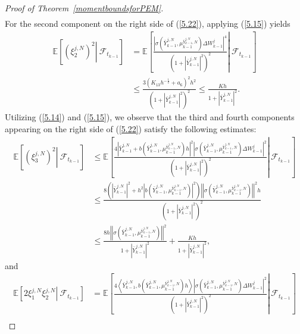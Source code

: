 \documentclass[12pt]{article}
\numberwithin{equation}{section}
\begin{document}
\begin{proof}[Proof of Theorem~\ref{momentboundsforPEM}]
\begin{equation}
\begin{aligned}
\end{aligned}
\end{equation}
For the second component on the right side of (\ref{5.22}), applying (\ref{5.15}) yields
\begin{equation}\tag{5.71}\label{5.24}
\begin{aligned}
\mathbb{E}\left[\left.\left(\xi^{j,N}_2\right)^2  \right\rvert\ \mathcal{F}_{t_{k-1}}\right] & =\mathbb{E}\left[\left.\tfrac{\left|\sigma\left(\bar{Y}^{j,N}_{k-1},\mu^{\bar{Y}^{j,N}_{k-1},N}_{k-1}\right) \Delta W_{k-1}^{j}\right|^4}{\left(1+\left|\bar{Y}^{j,N}_{k-1}\right|^2\right)^2}  \right\rvert\ \mathcal{F}_{t_{k-1}}\right] \\
& \leq \tfrac{3\left(K_{13} h^{-\frac{1}{2}}+a_6\right)^2 h^2}{\left(1+\left|\bar{Y}^{j,N}_{k-1}\right|^2\right)^2}   \leq \tfrac{K h}{1+\left|\bar{Y}^{j,N}_{k-1}\right|^2}.
\end{aligned}
\end{equation}
Utilizing (\ref{5.14}) and (\ref{5.15}), we observe that the third and fourth components appearing on the right side of (\ref{5.22}) satisfy the following estimates:
\begin{equation}\tag{5.72}\label{5.25}
\begin{aligned}
\mathbb{E}\left[\left.\left(\xi^{j,N}_3\right)^2  \right\rvert\ \mathcal{F}_{t_{k-1}}\right] & \leq\mathbb{E}\left[\left.\tfrac{4\left|\bar{Y}^{j,N}_{k-1}+b\left(\bar{Y}^{j,N}_{k-1},\mu^{\bar{Y}^{j,N}_{k-1},N}_{k-1}\right)h\right|^2\left|\sigma\left(\bar{Y}^{j,N}_{k-1},\mu^{\bar{Y}^{j,N}_{k-1},N}_{k-1}\right) \Delta W_{k-1}^{j}\right|^2}{\left(1+\left|\bar{Y}^{j,N}_{k-1}\right|^2\right)^2} \right\rvert\, \mathcal{F}_{t_{k-1}}\right] \\
&\leq \tfrac{8\left( \left|\bar{Y}_{k-1}^{j,N}\right|^2+h^2\left|b\left( \bar{Y}_{k-1}^{j,N},\mu _{k-1}^{\bar{Y}_{k-1}^{j,N},N} \right) \right|^2 \right) \left|\left|\sigma \left( \bar{Y}_{k-1}^{j,N},\mu _{k-1}^{\bar{Y}_{k-1}^{j,N},N} \right) \right|\right|^2h}{\left( 1+\left|\bar{Y}_{k-1}^{j,N}\right|^2 \right) ^2}\\
& \leq \tfrac{8h\left|\left|\sigma\left(\bar{Y}^{j,N}_{k-1},\mu^{\bar{Y}^{j,N}_{k-1},N}_{k-1}\right)\right|\right|^2}{1+\left|\bar{Y}^{j,N}_{k-1}\right|^2}+\tfrac{K h}{1+\left|\bar{Y}^{j,N}_{k-1}\right|^2},
\end{aligned}
\end{equation}
and
\begin{equation}\tag{5.73}\label{5.26}
\begin{aligned}
\mathbb{E}\left[\left.2 \xi^{j,N}_1 \xi^{j,N}_2  \right\rvert\ \mathcal{F}_{t_{k-1}}\right] & =\mathbb{E}\left[\left.\tfrac{4\left\langle\bar{Y}^{j,N}_{k-1}, b\left(\bar{Y}^{j,N}_{k-1},\mu^{\bar{Y}^{j,N}_{k-1},N}_{k-1}\right)h\right\rangle\left|\sigma\left(\bar{Y}^{j,N}_{k-1},\mu^{\bar{Y}^{j,N}_{k-1},N}_{k-1}\right) \Delta W_{k-1}^{j}\right|^2}{\left(1+\left|\bar{Y}^{j,N}_{k-1}\right|^2\right)^2} \right\rvert\, \mathcal{F}_{t_{k-1}}\right] \\

\end{aligned}
\end{equation}
\end{proof}
\end{document}
